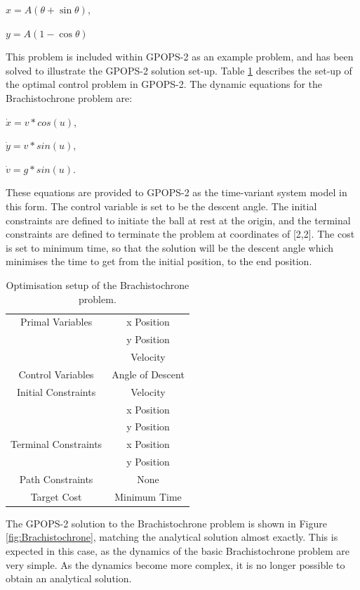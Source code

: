 $x = A(\theta + \sin\theta) $,

$y=A(1 - \cos\theta)$

This problem is included within GPOPS-2 as an example problem, and has been solved to illustrate the GPOPS-2 solution set-up\cite{Rao2010}. Table \ref{tab:brachistochrone} describes the set-up of the optimal control problem in GPOPS-2. The dynamic equations for the Brachistochrone problem are:

$\dot{x} = v*cos(u)$,

$\dot{y} = v*sin(u)$,

$\dot{v} = g*sin(u)$.

\noindent These equations are provided to GPOPS-2 as the time-variant system model in this form. The control variable is set to be the descent angle. The initial constraints are defined to initiate the ball at rest at the origin, and the terminal constraints are defined to terminate the problem at coordinates of [2,2]. The cost is set to minimum time, so that the solution will be the descent angle which minimises the time to get from the initial position, to the end position. 

\begin{table}
	\centering
	\begin{tabular}{|c|c|}
		\hline Primal Variables  & x Position\\& y Position\\& Velocity\\ 
		\hline Control Variables  & Angle of Descent\\ 
		\hline Initial Constraints  & Velocity\\ & x Position\\ & y Position\\
		\hline Terminal Constraints &  x Position\\ & y Position\\
		\hline Path Constraints & None \\ 
		\hline Target Cost & Minimum Time \\ 
		\hline 
	\end{tabular} 
	\caption{Optimisation setup of the Brachistochrone problem. }
	\label{tab:brachistochrone}
\end{table}


The GPOPS-2 solution to the Brachistochrone problem is shown in Figure \ref{fig:Brachistochrone}, matching the analytical solution almost exactly. This is expected in this case, as the dynamics of the basic Brachistochrone problem are very simple. As the dynamics become more complex, it is no longer possible to obtain an analytical solution.  

